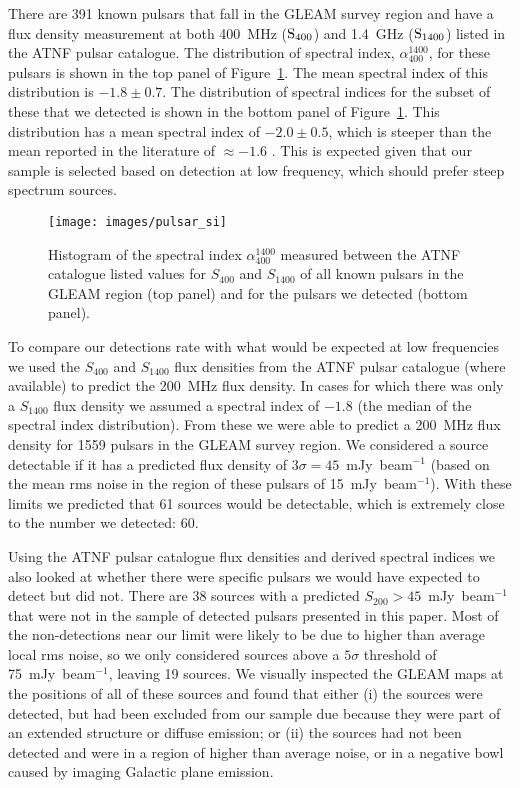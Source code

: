 \documentclass{pasa}%
\newcommand{\changed}[1]{{#1}}
\begin{document}
There are 391 known pulsars that fall in the GLEAM survey region and have a flux density measurement at both 400~MHz (${\rm S}_{400}$) and 1.4~GHz (${\rm S}_{1400}$) listed in the ATNF pulsar catalogue. The distribution of spectral index, $\alpha_{400}^{1400}$, for these pulsars is shown in the top panel of Figure~\ref{f_si}. \changed{The mean spectral index of this distribution is $-1.8\pm0.7$. The distribution of spectral indices for
the subset of these that we detected is shown in the bottom panel of Figure~\ref{f_si}. This distribution has a mean spectral index of $-2.0\pm0.5$, which is steeper than the mean reported in the
literature of $\approx -1.6$ \citep{lorimer95}. This is expected given that our sample is selected based on detection at low frequency, which should prefer steep spectrum sources.}
\begin{figure}
\texttt{[image: images/pulsar\_si]}
\caption{Histogram of the spectral index $\alpha_{400}^{1400}$ measured between the ATNF catalogue listed values for
$S_{400}$ and $S_{1400}$ of all known pulsars in the GLEAM region (top panel) and for the pulsars we detected (bottom panel).}\label{f_si}
\end{figure}

\changed{To compare our detections rate with what would be expected at low frequencies we used the $S_{400}$ and $S_{1400}$ flux densities from the ATNF pulsar catalogue (where available) to predict the 200~MHz flux density.
In cases for which there was only a $S_{1400}$ flux density we assumed a spectral index of $-1.8$ (the median of the spectral index distribution). From these we were able to predict a 200~MHz flux density for 1559 pulsars in the GLEAM survey region. We considered 
a source detectable if it has a predicted flux density of $3\sigma = 45$~mJy~beam$^{-1}$ (based on the mean rms noise in the region of these pulsars of 15~mJy~beam$^{-1}$). 
With these limits we predicted that 61 sources would be detectable, which is extremely close to the number we detected: 60.
}

Using the ATNF pulsar catalogue flux densities and derived spectral indices we also looked at whether there were specific pulsars we would have expected to detect but did not. There are 38 sources with a predicted
$S_{200} > 45$~mJy~beam$^{-1}$ that were not in the sample of detected pulsars presented in this paper. Most of the non-detections near our limit were likely to be due to higher than average local rms noise, so we only considered sources above a $5\sigma$ threshold of 75~mJy~beam$^{-1}$, leaving 19 sources. We visually inspected the GLEAM maps at the positions of
all of these sources and found that either (i) the sources were detected, but had been excluded from our sample due because they were part of an extended structure or diffuse emission; or (ii) the sources had not
been detected and were in a region of higher than average noise, or in a negative bowl caused by imaging Galactic plane emission.
\end{document}
